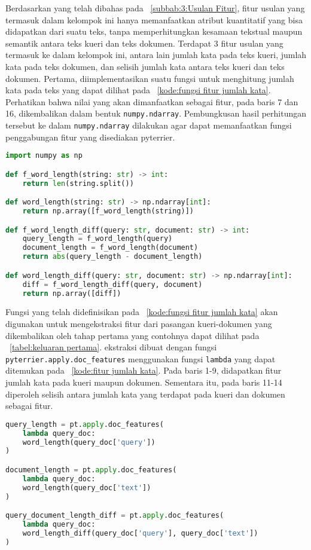 Berdasarkan yang telah dibahas pada \subbab{}~\ref{subbab:3:Usulan Fitur}, fitur usulan yang termasuk dalam kelompok ini hanya memanfaatkan atribut kuantitatif yang bisa didapatkan dari suatu teks, tanpa memperhitungkan kesamaan tekstual maupun semantik antara teks kueri dan teks dokumen. Terdapat 3 fitur usulan yang termasuk ke dalam kelompok ini, antara lain jumlah kata pada teks kueri, jumlah kata pada teks dokumen, dan selisih jumlah kata antara teks kueri dan teks dokumen. Pertama, diimplementasikan suatu fungsi untuk menghitung jumlah kata pada teks yang dapat dilihat pada \kode{}~\ref{kode:fungsi fitur jumlah kata}. Perhatikan bahwa nilai yang akan dimanfaatkan sebagai fitur, pada baris 7 dan 16, dikembalikan dalam bentuk \lstinline{numpy.ndarray}. Pembungkusan hasil perhitungan tersebut ke dalam \lstinline{numpy.ndarray} dilakukan agar dapat memanfaatkan fungsi penggabungan fitur yang disediakan pyterrier.


\begin{lstlisting}[language=Python, caption={Fungsi fitur jumlah kata}, label={kode:fungsi fitur jumlah kata}]
import numpy as np

def f_word_length(string: str) -> int:
    return len(string.split())

def word_length(string: str) -> np.ndarray[int]:
    return np.array([f_word_length(string)])

def f_word_length_diff(query: str, document: str) -> int:
    query_length = f_word_length(query)
    document_length = f_word_length(document)
    return abs(query_length - document_length)

def word_length_diff(query: str, document: str) -> np.ndarray[int]:
    diff = f_word_length_diff(query, document)
    return np.array([diff])
\end{lstlisting}

Fungsi yang telah didefinisikan pada \kode{}~\ref{kode:fungsi fitur jumlah kata} akan digunakan untuk mengekstraksi fitur dari pasangan kueri-dokumen yang dikembalikan oleh tahap \ranking{} pertama yang contohnya dapat dilihat pada \tabel{}~\ref{tabel:keluaran pertama}. \Pipeline{} ekstraksi dibuat dengan fungsi \lstinline{pyterrier.apply.doc_features} menggunakan fungsi \lstinline{lambda} yang dapat ditemukan pada \kode{}~\ref{kode:fitur jumlah kata}. Pada baris 1-9, didapatkan fitur jumlah kata pada kueri maupun dokumen. Sementara itu, pada baris 11-14 diperoleh selisih antara jumlah kata yang terdapat pada kueri dan dokumen sebagai fitur.
\begin{lstlisting}[language=Python, caption={\Pipeline{} ekstraksi fitur jumlah kata}, label={kode:fitur jumlah kata}]
query_length = pt.apply.doc_features(
    lambda query_doc:
    word_length(query_doc['query'])
)

document_length = pt.apply.doc_features(
    lambda query_doc:
    word_length(query_doc['text'])
)

query_document_length_diff = pt.apply.doc_features(
    lambda query_doc:
    word_length_diff(query_doc['query'], query_doc['text'])
)
\end{lstlisting}








